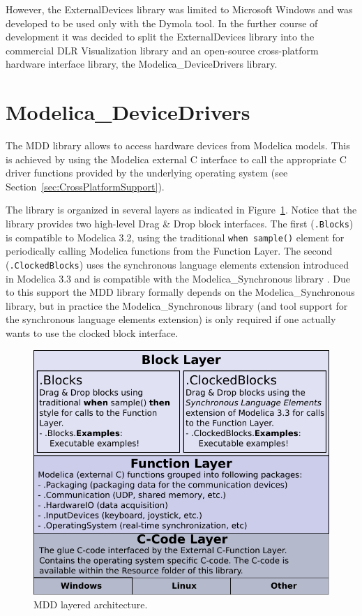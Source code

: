 \documentclass{resources/modelica}
\newcommand{\modelica}[1]{\lstinline[language=modelica]|#1|}
\newcommand{\BTHI}[1]{{\color{blue}{$\parallel_\textrm{BTHI}$#1$\parallel$}}}
\begin{document}
However, the ExternalDevices library was limited to
Microsoft Windows and was developed to be used only with
the Dymola tool. In the further course of development it was decided to
split the ExternalDevices library into the commercial DLR
Visualization library and an open-source cross-platform hardware interface
library, the Modelica\_DeviceDrivers library.




\section{Modelica\_DeviceDrivers}
\label{ModelicaDeviceDrivers}
\BTHI{TODO: Bernhard, Thomas, Volker}

The MDD library allows to access hardware devices from Modelica models.
This is achieved by using the Modelica external C interface to call the
appropriate C driver functions provided by the underlying operating system (see
Section~\ref{sec:CrossPlatformSupport}).

The library is organized in several layers as indicated in
Figure~\ref{fig:MDDLayeredArchitecture}. Notice that the library
provides two high-level Drag \& Drop block interfaces. The first (\texttt{.Blocks}) is
compatible to Modelica 3.2, using the traditional \modelica{when sample()}
element for periodically calling Modelica functions from the \textsf{Function Layer}. The second
(\texttt{.ClockedBlocks}) uses the synchronous language elements extension
introduced in Modelica 3.3 and is compatible with the
Modelica\_Synchronous library \citep{Otter2012}. Due to this support the MDD
library formally depends on the Modelica\_Synchronous library, but in
practice the Modelica\_Synchronous library (and tool support for the
synchronous language elements extension) is only required if one actually wants
to use the clocked block interface.
\begin{figure}[htb]
\begin{center}
  \includegraphics[width=\columnwidth]{figures/MDDLayeredArchitecture}
  \caption{MDD layered architecture.}
  \label{fig:MDDLayeredArchitecture}
\end{center}
\end{figure}
\end{document}
